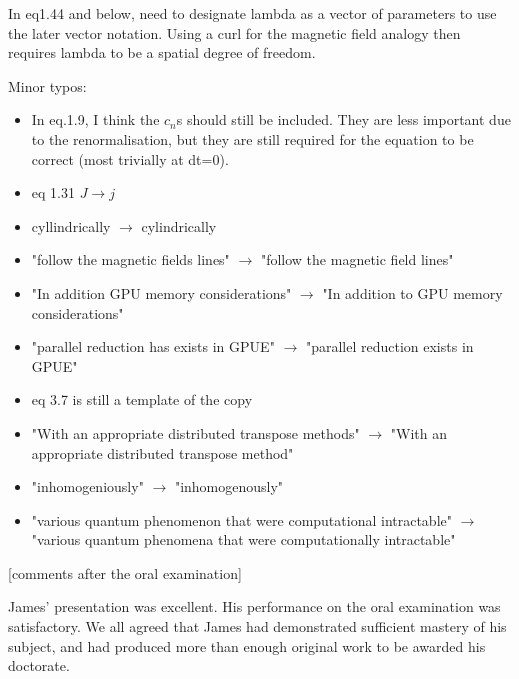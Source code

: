 \documentclass[11pt]{article}
\begin{document}

In eq1.44 and below, need to designate lambda as a vector of parameters to use the later vector notation. Using a curl for the magnetic field analogy then requires lambda to be a spatial degree of freedom.



Minor typos:

\begin{itemize}
\item In eq.1.9, I think the $c_{n}$s should still be included. They are less important due to the renormalisation, but they are still required for the equation to be correct (most trivially at dt=0).

\item eq 1.31 $J \rightarrow j$
\item cyllindrically $\rightarrow$ cylindrically
\item "follow the magnetic fields lines" $\rightarrow$ "follow the magnetic field lines"
\item "In addition GPU memory considerations" $\rightarrow$ "In addition to GPU memory considerations"
\item "parallel reduction has exists in GPUE" $\rightarrow$ "parallel reduction exists in GPUE"
\item eq 3.7 is still a template of the copy
\item "With an appropriate distributed transpose methods" $\rightarrow$ "With an appropriate distributed transpose method"
\item "inhomogeniously" $\rightarrow$ "inhomogenously"
\item "various quantum phenomenon that were computational intractable" $\rightarrow$ "various quantum phenomena that were computationally intractable"

\end{itemize}


[comments after the oral examination]

James’ presentation was excellent. His performance on the oral examination was satisfactory. We all agreed that James had demonstrated sufficient mastery of his subject, and had produced more than enough original work to be awarded his doctorate.
\end{document}
